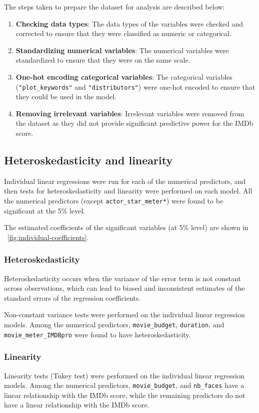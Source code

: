 \documentclass[12pt,a4paper]{article}
\begin{document}
The steps taken to prepare the dataset for analysis are described below:
\begin{enumerate}
    \item \textbf{Checking data types}: The data types of the variables were checked and corrected to ensure that they were classified as numeric or categorical.
    \item \textbf{Standardizing numerical variables}: The numerical variables were standardized to ensure that they were on the same scale.
    \item \textbf{One-hot encoding categorical variables}: The categorical variables (\texttt{"plot\_keywords"} and \texttt{"distributors"}) were one-hot encoded to ensure that they could be used in the model.
    \item \textbf{Removing irrelevant variables}: Irrelevant variables were removed from the dataset as they did not provide significant predictive power for the IMDb score.
\end{enumerate}

\subsection{Heteroskedasticity and linearity}\label{subsec:heteroskedasticity-linearity}
Individual linear regressions were run for each of the numerical predictors, and then tests for heteroskedasticity and linearity were performed on each model.
All the numerical predictors (except \texttt{actor\_star\_meter*}) were found to be significant at the 5\% level.

The estimated coefficients of the significant variables (at 5\% level) are shown in \figurename~\ref{fig:individual-coefficients}.

\subsubsection{Heteroskedasticity}\label{subsubsec:heteroskedasticity}
Heteroskedasticity occurs when the variance of the error term is not constant across observations, which can lead to biased and inconsistent estimates of the standard errors of the regression coefficients.

Non-constant variance tests were performed on the individual linear regression models.
Among the numerical predictors, \texttt{movie\_budget}, \texttt{duration}, and \texttt{movie\_meter\_IMDBpro} were found to have heteroskedasticity.

\subsubsection{Linearity}\label{subsubsec:linearity}
Linearity tests (Tukey test) were performed on the individual linear regression models.
Among the numerical predictors, \texttt{movie\_budget}, and \texttt{nb\_faces} have a linear relationship with the IMDb score, while the remaining predictors do not have a linear relationship with the IMDb score.
\end{document}
